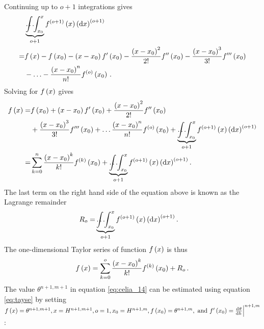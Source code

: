 Continuing up to $o + 1$ integrations gives
\begin{align*}
  &\underbrace{\int \hspace{-4mm} \hdots \hspace{-1mm} \int_{x_0}^x}_{o+1}{f^{\del{ o+1 }}\del{ x }\del{ \dif x }^{\del{ o+1 }}} \\
  = &f\del{ x } - f\del{ x_0 } - \del{ x - x_0 } f'\del{ x_0 } - \frac{\del{ x - x_0 }^2}{2!} f''\del{ x_0 } - \frac{\del{ x - x_0 }^3}{3!} f'''\del{ x_0 } \\
  &- \mathellipsis - \frac{\del{ x - x_0 }^n}{n!} f^{\del{ o }}\del{ x_0 } \, .
\end{align*}
Solving for $f\del{ x }$ gives
\begin{align*}
  f\del{ x } = &f\del{ x_0 }
           + \del{ x - x_0 } f'\del{ x_0 }
           + \frac{\del{ x-x_0 }^2}{2!} f''\del{ x_0 } \\
         &+ \frac{\del{ x - x_0 }^3}{3!} f'''\del{ x_0 }
           + \mathellipsis \frac{\del{ x - x_0 }^n}{n!} f^{\del{ o }}\del{ x_0 }
           + \underbrace{\int \hspace{-4mm} \hdots \hspace{-1mm} \int_{x_0}^x}_{o+1}{f^{\del{ o+1 }}\del{ x }\del{ \dif x }^{\del{ o+1 }}} \\
  = &\sum_{k=0}^n{\frac{\del{ x - x_0 }^k}{k!}}f^{\del{ k }}\del{ x_0 } + \underbrace{\int \hspace{-4mm} \hdots \hspace{-1mm} \int_{x_0}^x}_{o+1}{f^{\del{ o+1 }}\del{ x }\del{ \dif x }^{\del{ o+1 }}} \, .
\end{align*}
The last term on the right hand side of the equation above is known as the Lagrange remainder
\begin{align*}
  R_o = &\underbrace{\int \hspace{-4mm} \hdots \hspace{-1mm} \int_{x_0}^x}_{o+1}{f^{\del{ o+1 }}\del{ x }\del{ \dif x }^{\del{ o+1 }}} \, .
\end{align*}
The one-dimensional Taylor series of function $f\del{ x }$ is thus
\begin{equation}
  \label{eq:tayse}
  f\del{ x } = \sum_{k=0}^o{\frac{\del{ x - x_0 }^k}{k!}}f^{\del{ k }}\del{ x_0 } + R_o \, .
\end{equation}
The value $\theta^{n+1,m+1}$ in equation \eqref{eq:celia_14} can be estimated using equation \eqref{eq:tayse} by setting $ f\del{ x } = \theta^{n+1,m+1}, x = H^{n+1,m+1}, o = 1, x_0 = H^{n+1,m}, f\del{ x_0 } = \theta^{n+1,m}, \text{ and } f'\del{ x_0 } = \evalat{\od{\theta}{h}}{n+1,m}$ \parencite{celia_general_1990}:
